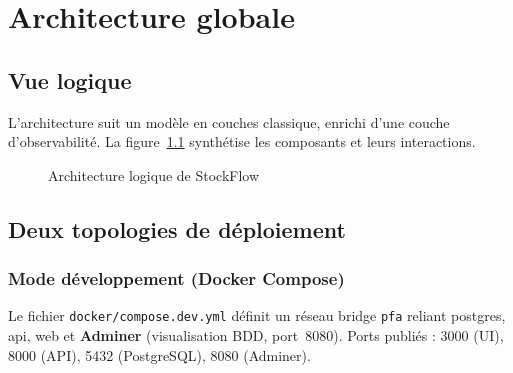 \chapter{Architecture globale}
\label{ch:archi}

\section{Vue logique}

L'architecture suit un modèle en couches classique, enrichi d'une couche d'observabilité. La figure~\ref{fig:archi-logique} synthétise les composants et leurs interactions.

\begin{figure}[htbp]
  \centering
  \caption{Architecture logique de StockFlow}
  \label{fig:archi-logique}
\end{figure}

\section{Deux topologies de déploiement}

\subsection{Mode développement (Docker Compose)}

Le fichier \texttt{docker/compose.dev.yml} définit un réseau bridge \texttt{pfa} reliant postgres, api, web et \textbf{Adminer} (visualisation BDD, port~8080). Ports publiés : 3000 (UI), 8000 (API), 5432 (PostgreSQL), 8080 (Adminer).


